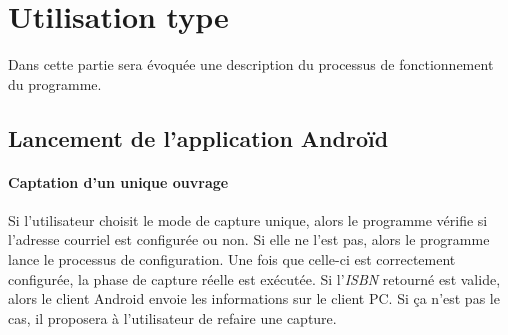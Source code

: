 \section{Utilisation type}
Dans cette partie sera évoquée une description du processus de fonctionnement du programme.

\subsection{Lancement de l'application Androïd}

\paragraph{Captation d'un unique ouvrage} 


Si l'utilisateur choisit le mode de capture unique, alors le programme vérifie si l'adresse courriel est configurée ou non. 
Si elle ne l'est pas, alors le programme lance le processus de configuration. 
Une fois que celle-ci est correctement configurée, la phase de capture réelle est exécutée. 
Si l'\emph{ISBN} retourné est valide, alors le client Android envoie les informations sur le client PC. 
Si ça n'est pas le cas, il proposera à l'utilisateur de refaire une capture. 


\begin{figure}[htbp]
  \begin{center}
    \leavevmode
    \hspace{4cm}
  \end{center}
\end{figure}

